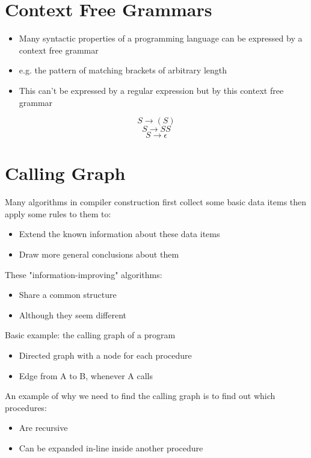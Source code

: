 \documentclass{article}[18pt]
\begin{document}
\section{Context Free Grammars}
\begin{itemize}
	\item Many syntactic properties of a programming language can be expressed by a context free grammar
	\item e.g. the pattern of matching brackets of arbitrary length 
	\item This can't be expressed by a regular expression but by this context free grammar
\end{itemize}
$$S\rightarrow (S)$$
$$S\rightarrow SS$$
$$S\rightarrow \epsilon$$
\section{Calling Graph}
Many algorithms in compiler construction first collect some basic data items then apply some rules to them to:
\begin{itemize}
	\item Extend the known information about these data items
	\item Draw more general conclusions about them
\end{itemize}
These "information-improving" algorithms:
\begin{itemize}
	\item Share a common structure
	\item Although they seem different
\end{itemize}
Basic example: the calling graph of a program
\begin{itemize}
	\item Directed graph with a node for each procedure
	\item Edge from A to B, whenever A calls
\end{itemize}
An example of why we need to find the calling graph is to find out which procedures:
\begin{itemize}
	\item Are recursive
	\item Can be expanded in-line inside another procedure
\end{itemize}
\end{document}

